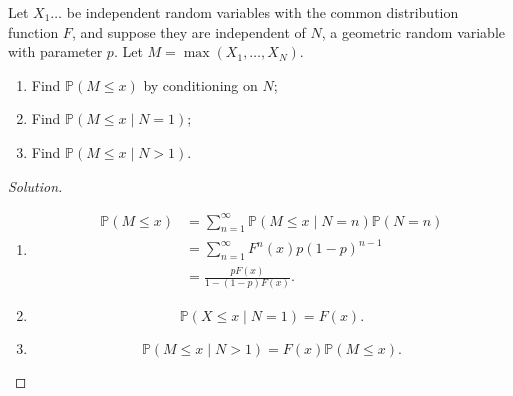 \documentclass{article}[12pt]
\newenvironment{solution}
  {\renewcommand\qedsymbol{$\blacksquare$}\begin{proof}[Solution]}
  {\end{proof}}
\newenvironment{problem}[1]
  {\renewcommand\theinnercustomprblm{#1}\innercustomprblm}
  {\endinnercustomprblm}
\renewcommand{\P}{\mathbb{P}}
\begin{document}
\begin{problem}{7.61(a-c)}
Let $X_{1}\dots$ be independent random variables with the common distribution function $F$, and suppose they are independent of $N$, a geometric random variable with parameter $p$.
Let $M =\max(X_{1}, \dots, X_{N})$.
\begin{enumerate}[label=(\alph*)]
    \item Find $\P(M\leqslant x)$ by conditioning on $N$;
    \item Find $\P(M\leqslant x\mid N = 1)$;
    \item Find $\P(M\leqslant x\mid N > 1)$.
\end{enumerate}
\end{problem}
\begin{solution}
\text{}
\begin{enumerate}[label=(\alph*)]
    \item
    \begin{align*}
        \P(M \leqslant x) &= \sum_{n=1}^{\infty}\P(M \leqslant x\mid N = n)\P(N = n)
        \\
        &= \sum_{n=1}^{\infty}F^{n}(x)p(1 - p)^{n-1}
        \\
        &= \frac{pF(x)}{1 - (1 - p)F(x)}.
    \end{align*}
    \item
    \begin{equation*}
        \P(X \leqslant x\mid N = 1) = F(x).
    \end{equation*}
    \item
    \begin{equation*}
        \P(M\leqslant x\mid N > 1) = F(x)\P(M \leqslant x).
    \end{equation*}
\end{enumerate}
\end{solution}
\end{document}
